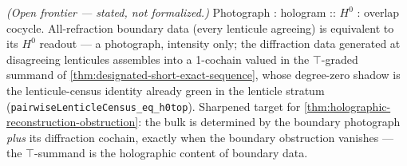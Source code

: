 \begin{theorem}\label{thm:hologram-top-summand}\notready{}
\emph{(Open frontier --- stated, not formalized.)} Photograph : hologram :: $H^{0}$ :
overlap cocycle. All-refraction boundary data (every lenticule agreeing) is equivalent
to its $H^{0}$ readout --- a photograph, intensity only; the diffraction data generated
at disagreeing lenticules assembles into a 1-cochain valued in the $\top$-graded summand
of \cref{thm:designated-short-exact-sequence}, whose degree-zero shadow is the
lenticule-census identity already green in the lenticle stratum
(\texttt{pairwiseLenticleCensus\_eq\_h0top}). Sharpened target for
\cref{thm:holographic-reconstruction-obstruction}: the bulk is determined by the
boundary photograph \emph{plus} its diffraction cochain, exactly when the boundary
obstruction vanishes --- the $\top$-summand is the holographic content of boundary data.
\end{theorem}
